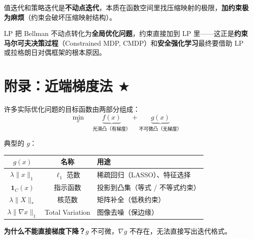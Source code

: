 \documentclass[12pt, a4paper]{ctexart}
\begin{document}
\begin{blackboard}
\begin{keypoint}[为什么安全强化学习要回到 LP？]
值迭代和策略迭代是\textbf{不动点迭代}，本质在函数空间里找压缩映射的极限，\textbf{加约束极为麻烦}（约束会破坏压缩映射结构）。

LP 把 Bellman 不动点转化为\textbf{全局优化问题}，约束直接加到 LP 里——这正是\textbf{约束马尔可夫决策过程}（Constrained MDP, CMDP）和\textbf{安全强化学习}最终要借助 LP 或拉格朗日对偶框架的根本原因。
\end{keypoint}

\end{blackboard}

\section{附录：近端梯度法 $\bigstar$}

\begin{blackboard}

许多实际优化问题的目标函数由两部分组成：
\[
\min_x \quad \underbrace{f(x)}_{\text{光滑凸（有梯度）}} + \underbrace{g(x)}_{\text{不可微凸（无梯度）}}
\]

典型的 $g$：
\begin{center}
\begin{tabular}{c|c|l}
$g(x)$ & 名称 & 用途 \\
\hline
$\lambda\|x\|_1$ & $\ell_1$ 范数 & 稀疏回归（LASSO）、特征选择 \\
$\mathbf{1}_C(x)$ & 指示函数 & 投影到凸集（等式 / 不等式约束） \\
$\lambda\|X\|_*$ & 核范数 & 矩阵补全（低秩约束） \\
$\lambda\|\nabla x\|_1$ & Total Variation & 图像去噪（保边缘）
\end{tabular}
\end{center}

\textbf{为什么不能直接梯度下降？}$g$ 不可微，$\nabla g$ 不存在，无法直接写出迭代格式。

\end{blackboard}
\end{document}
